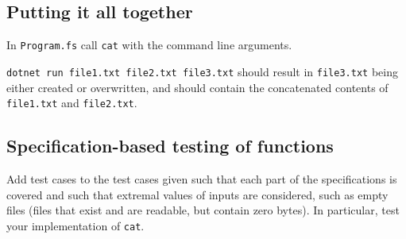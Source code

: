 \subsection*{Putting it all together}

In \texttt{Program.fs} call \texttt{cat} with the command line arguments.

\texttt{dotnet run file1.txt file2.txt file3.txt} should result in \texttt{file3.txt} being either created or overwritten, and should contain the concatenated contents of \texttt{file1.txt} and \texttt{file2.txt}.

\subsection*{Specification-based testing of functions}

Add test cases to the test cases given %
such that each part of the specifications is covered and such that  extremal values of inputs are considered, such as empty files (files that exist and are readable, but contain zero bytes).   In particular, test your implementation of \texttt{cat}.
